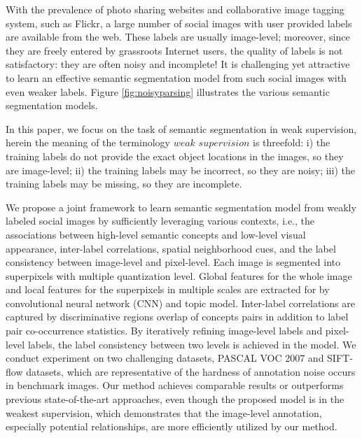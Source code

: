 With the prevalence of photo sharing websites and collaborative image tagging system, such as Flickr, a large number of social images with user provided labels are available from the web. These labels are usually image-level; moreover, since they are freely entered by grassroots Internet users, the quality of labels is not satisfactory: they are often noisy and incomplete!  It is challenging yet attractive to learn an effective semantic segmentation model from such social images with even weaker labels.  Figure \ref{fig:noisyparsing} illustrates the various  semantic segmentation models.

In this paper,  we focus on the task of semantic segmentation in weak supervision, herein the
meaning of the terminology $weak$ $ supervision$ is threefold:
i) the training labels do not provide the exact object locations in the images, so they are image-level;
ii) the training labels may be incorrect, so they are noisy;
iii) the training labels may be missing, so they are incomplete.

We propose a  joint framework  to learn  semantic segmentation model from weakly labeled social images by sufficiently leveraging various contexts, i.e., the associations between high-level semantic concepts and low-level visual appearance, inter-label correlations, spatial neighborhood cues, and the label consistency between image-level and pixel-level. Each image is segmented  into  superpixels with multiple quantization level.  Global features for the whole image and local features for the superpixels in multiple scales   are extracted for by convolutional neural network (CNN) and topic model. Inter-label correlations  are captured by discriminative regions overlap of concepts pairs in addition to label pair co-occurrence statistics. By iteratively refining image-level labels and pixel-level labels, the label consistency between two levels is achieved in the model. We conduct experiment  on two challenging datasets, PASCAL VOC 2007 and SIFT-flow datasets,  which are representative of the hardness of annotation noise occurs in benchmark images. Our method achieves comparable results or outperforms previous state-of-the-art approaches, even though the proposed model is in the weakest  supervision, which  demonstrates that the image-level annotation, especially potential relationships, are more efficiently utilized by our method.


